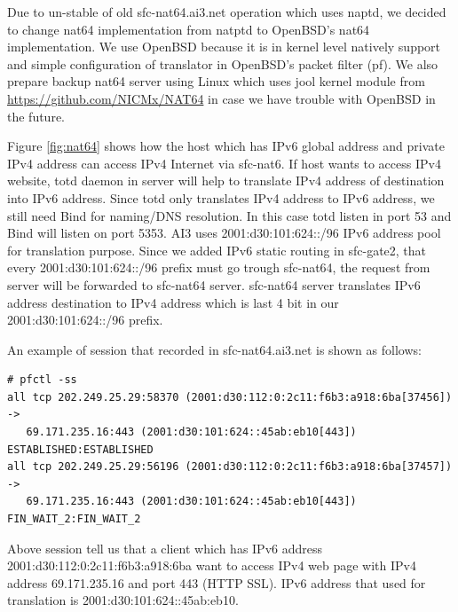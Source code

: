 \documentclass{article}
\begin{document}
Due to un-stable of old sfc-nat64.ai3.net operation which uses naptd, we decided to change nat64 implementation from natptd to OpenBSD's nat64 implementation.  
We use OpenBSD because it is in kernel level natively support and simple configuration of translator in OpenBSD's packet filter (pf).
We also prepare backup nat64 server using Linux which uses jool kernel module from \url{https://github.com/NICMx/NAT64} in case we have trouble with OpenBSD in the future. 

Figure \ref{fig:nat64} shows how the host which has IPv6 global address and private IPv4 address can access IPv4 Internet via sfc-nat6. 
If host wants to access IPv4 website, totd daemon in server will help to translate IPv4 address of destination into IPv6 address. 
Since totd only translates IPv4 address to IPv6 address, we still need Bind for naming/DNS resolution. 
In this case totd listen in port 53 and Bind will listen on port 5353. 
AI3 uses 2001:d30:101:624::/96 IPv6 address pool for translation purpose.  
Since we added IPv6 static routing in sfc-gate2, that every 2001:d30:101:624::/96 prefix must go trough sfc-nat64, the request from server will be forwarded to sfc-nat64 server. 
sfc-nat64 server translates IPv6 address destination to IPv4 address which is last 4 bit in our  2001:d30:101:624::/96 prefix.   

An example of session that recorded in sfc-nat64.ai3.net is shown as follows:  
\begin{verbatim}
# pfctl -ss     
all tcp 202.249.25.29:58370 (2001:d30:112:0:2c11:f6b3:a918:6ba[37456]) -> 
   69.171.235.16:443 (2001:d30:101:624::45ab:eb10[443]) ESTABLISHED:ESTABLISHED
all tcp 202.249.25.29:56196 (2001:d30:112:0:2c11:f6b3:a918:6ba[37457]) -> 
   69.171.235.16:443 (2001:d30:101:624::45ab:eb10[443]) FIN_WAIT_2:FIN_WAIT_2
\end{verbatim}

Above session tell us that a client which has IPv6 address 2001:d30:112:0:2c11:f6b3:a918:6ba want to access IPv4 web page with IPv4 address 69.171.235.16 and port 443 (HTTP SSL).  
IPv6 address that used for translation is 2001:d30:101:624::45ab:eb10.  
\end{document}
